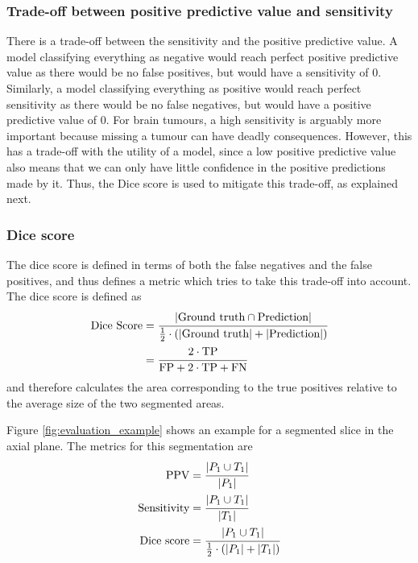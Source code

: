 \documentclass[12pt,a4paper,twoside,openright]{report}
\begin{document}
\subsubsection{Trade-off between positive predictive value and sensitivity }
There is a trade-off between the sensitivity and the positive predictive value. A model classifying everything as negative would reach perfect positive predictive value as there would be no false positives, but would have a sensitivity of 0. Similarly, a model classifying everything as positive would reach perfect sensitivity as there would be no false negatives, but would have a positive predictive value of 0. For brain tumours, a high sensitivity is arguably more important because missing a tumour can have deadly consequences. However, this has a trade-off with the utility of a model, since a low positive predictive value also means that we can only have little confidence in the positive predictions made by it. Thus, the Dice score is used to mitigate this trade-off, as explained next.

\subsubsection{Dice score}
The dice score is defined in terms of both the false negatives and the false positives, and thus defines a metric which tries to take this trade-off into account. The dice score is defined as
\begin{equation}
\begin{split}
	\textrm{Dice Score} & = \cfrac{\vert \textrm{Ground truth} \cap \textrm{Prediction}\vert}{\frac{1}{2} \cdot (\vert \textrm{Ground truth}\vert + \vert \textrm{Prediction}\vert)} \\
	&  = \cfrac{2 \cdot \textrm{TP}}{\textrm{FP} + 2 \cdot \textrm{TP} + \textrm{FN}}
\end{split}
\end{equation}
and therefore calculates the area corresponding to the true positives relative to the average size of the two segmented areas.

Figure \ref{fig:evaluation_example} shows an example for a segmented slice in the axial plane.  The metrics for this segmentation are
\begin{equation*}
\begin{split}
	\textrm{PPV} & = \cfrac{\vert P_1 \cup T_1 \vert}{\vert P_1 \vert} \\
	\textrm{Sensitivity} & = \cfrac{\vert P_1 \cup T_1 \vert}{\vert T_1 \vert} \\
	\textrm{Dice score} & = \cfrac{\vert P_1 \cup T_1 \vert}{\frac{1}{2} \cdot (\vert P_1 \vert + \vert T_1 \vert)} \\
\end{split}
\end{equation*}
\end{document}
